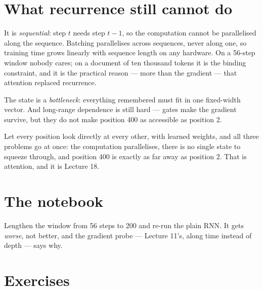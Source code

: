 \documentclass[11pt,a4paper]{article}
\begin{document}
\section{What recurrence still cannot do}

It is \emph{sequential}: step $t$ needs step $t-1$, so the computation cannot
be parallelised along the sequence. Batching parallelises across sequences,
never along one, so training time grows linearly with sequence length on any
hardware. On a 56-step window nobody cares; on a document of ten thousand
tokens it is the binding constraint, and it is the practical reason --- more
than the gradient --- that attention replaced recurrence.

The state is a \emph{bottleneck}: everything remembered must fit in one
fixed-width vector. And long-range dependence is still hard --- gates make the
gradient survive, but they do not make position 400 as accessible as position
2.

Let every position look directly at every other, with learned weights, and all
three problems go at once: the computation parallelises, there is no single
state to squeeze through, and position 400 is exactly as far away as position
2. That is attention, and it is Lecture 18.

\section{The notebook}

\begin{trybox}[title={What to change}]
Lengthen the window from 56 steps to 200 and re-run the plain RNN. It gets
\emph{worse}, not better, and the gradient probe --- Lecture 11's, along time
instead of depth --- says why.
\end{trybox}

\section{Exercises}
\end{document}
